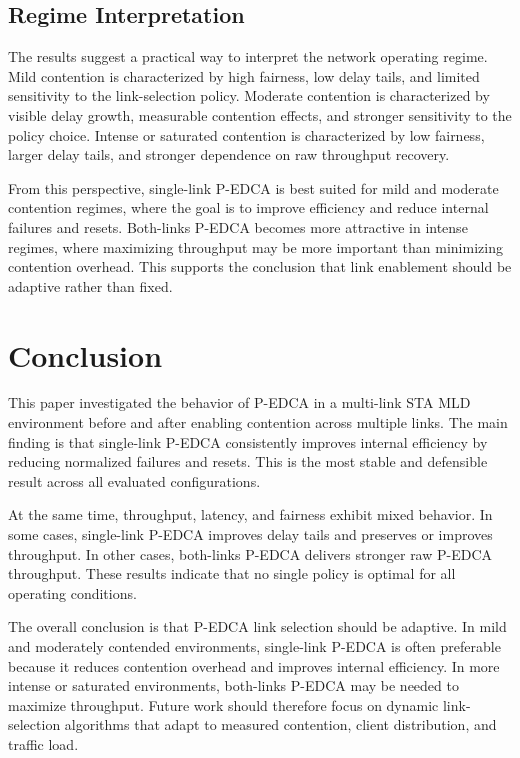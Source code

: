\documentclass[conference]{IEEEtran}
\begin{document}
\subsection{Regime Interpretation}
The results suggest a practical way to interpret the network operating regime. Mild contention is characterized by high fairness, low delay tails, and limited sensitivity to the link-selection policy. Moderate contention is characterized by visible delay growth, measurable contention effects, and stronger sensitivity to the policy choice. Intense or saturated contention is characterized by low fairness, larger delay tails, and stronger dependence on raw throughput recovery.

From this perspective, single-link P-EDCA is best suited for mild and moderate contention regimes, where the goal is to improve efficiency and reduce internal failures and resets. Both-links P-EDCA becomes more attractive in intense regimes, where maximizing throughput may be more important than minimizing contention overhead. This supports the conclusion that link enablement should be adaptive rather than fixed.

\section{Conclusion}
This paper investigated the behavior of P-EDCA in a multi-link STA MLD environment before and after enabling contention across multiple links. The main finding is that single-link P-EDCA consistently improves internal efficiency by reducing normalized failures and resets. This is the most stable and defensible result across all evaluated configurations.

At the same time, throughput, latency, and fairness exhibit mixed behavior. In some cases, single-link P-EDCA improves delay tails and preserves or improves throughput. In other cases, both-links P-EDCA delivers stronger raw P-EDCA throughput. These results indicate that no single policy is optimal for all operating conditions.

The overall conclusion is that P-EDCA link selection should be adaptive. In mild and moderately contended environments, single-link P-EDCA is often preferable because it reduces contention overhead and improves internal efficiency. In more intense or saturated environments, both-links P-EDCA may be needed to maximize throughput. Future work should therefore focus on dynamic link-selection algorithms that adapt to measured contention, client distribution, and traffic load.
\end{document}
